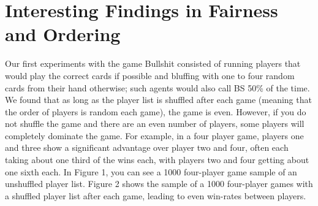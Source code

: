 \documentclass[a4paper,11pt]{article}
\begin{document}
\section{Interesting Findings in Fairness and Ordering}
	Our first experiments with the game Bullshit consisted of running players that would play the correct cards if possible and bluffing with one to four random cards from their hand otherwise; such agents would also call BS 50\% of the time. We found that as long as the player list is shuffled after each game (meaning that the order of players is random each game), the game is even. However, if you do not shuffle the game and there are an even number of players, some players will completely dominate the game. For example, in a four player game, players one and three show a significant advantage over player two and four, often each taking about one third of the wins each, with players two and four getting about one sixth each. In Figure 1, you can see a 1000 four-player game sample of an unshuffled player list. Figure 2 shows the sample of a 1000 four-player games with a shuffled player list after each game, leading to even win-rates between players.
\end{document}
